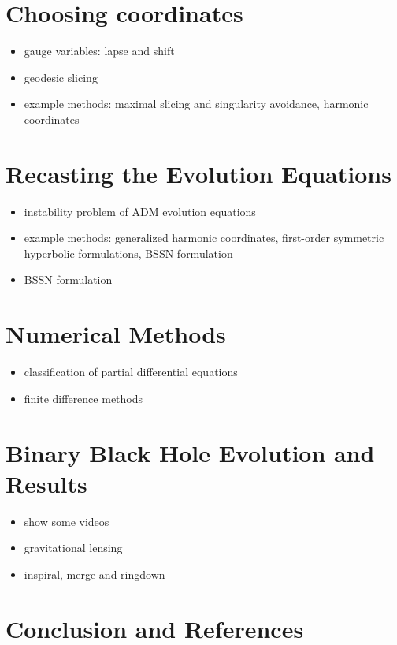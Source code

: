 \documentclass[twocolumn]{article}
\begin{document}
  \section{Choosing coordinates} %
  \label{sec:choosing_coordinates}
    \begin{itemize}
      \item gauge variables: lapse and shift
      \item geodesic slicing
      \item example methods: maximal slicing and singularity avoidance, harmonic coordinates
    \end{itemize}

  \section{Recasting the Evolution Equations} %
  \label{sec:recasting_the_evolution_equations}
    \begin{itemize}
      \item instability problem of ADM evolution equations
      \item example methods: generalized harmonic coordinates, first-order symmetric hyperbolic formulations, BSSN formulation
      \item BSSN formulation
    \end{itemize}

  \section{Numerical Methods} %
  \label{sec:numerical_methods}
    \begin{itemize}
      \item classification of partial differential equations
      \item finite difference methods
    \end{itemize}

  \section{Binary Black Hole Evolution and Results} %
  \label{sec:binary_black_hole_evolution_and_results}
    \begin{itemize}
      \item show some videos
      \item gravitational lensing
      \item inspiral, merge and ringdown
    \end{itemize}

  \section{Conclusion and References} %
  \label{sec:references}

  \nocite{*}
  
  

\end{document}

